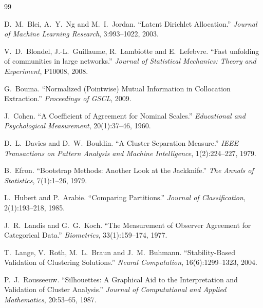 \documentclass[12pt]{article}
\begin{document}
\begin{thebibliography}{99}

D.~M.~Blei, A.~Y.~Ng and M.~I.~Jordan.
\newblock ``Latent Dirichlet Allocation.''
\newblock \emph{Journal of Machine Learning Research}, 3:993--1022, 2003.

V.~D.~Blondel, J.-L.~Guillaume, R.~Lambiotte and E.~Lefebvre.
\newblock ``Fast unfolding of communities in large networks.''
\newblock \emph{Journal of Statistical Mechanics: Theory and Experiment}, P10008, 2008.

G.~Bouma.
\newblock ``Normalized (Pointwise) Mutual Information in Collocation Extraction.''
\newblock \emph{Proceedings of GSCL}, 2009.

J.~Cohen.
\newblock ``A Coefficient of Agreement for Nominal Scales.''
\newblock \emph{Educational and Psychological Measurement}, 20(1):37--46, 1960.

D.~L.~Davies and D.~W.~Bouldin.
\newblock ``A Cluster Separation Measure.''
\newblock \emph{IEEE Transactions on Pattern Analysis and Machine Intelligence}, 1(2):224--227, 1979.

B.~Efron.
\newblock ``Bootstrap Methods: Another Look at the Jackknife.''
\newblock \emph{The Annals of Statistics}, 7(1):1--26, 1979.

L.~Hubert and P.~Arabie.
\newblock ``Comparing Partitions.''
\newblock \emph{Journal of Classification}, 2(1):193--218, 1985.

J.~R.~Landis and G.~G.~Koch.
\newblock ``The Measurement of Observer Agreement for Categorical Data.''
\newblock \emph{Biometrics}, 33(1):159--174, 1977.

T.~Lange, V.~Roth, M.~L.~Braun and J.~M.~Buhmann.
\newblock ``Stability-Based Validation of Clustering Solutions.''
\newblock \emph{Neural Computation}, 16(6):1299--1323, 2004.

P.~J.~Rousseeuw.
\newblock ``Silhouettes: A Graphical Aid to the Interpretation and Validation of Cluster Analysis.''
\newblock \emph{Journal of Computational and Applied Mathematics}, 20:53--65, 1987.

\end{thebibliography}
\end{document}
